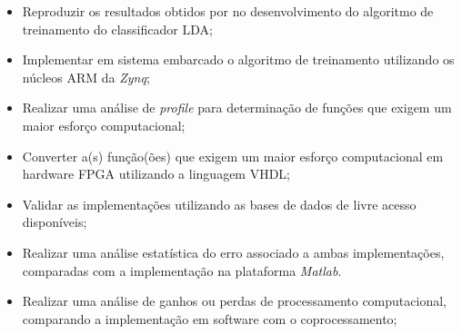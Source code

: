 \begin{itemize}
	\item Reproduzir os resultados obtidos por \cite{F.Lotte} no desenvolvimento do algoritmo de treinamento do classificador LDA;

	\item Implementar em sistema embarcado o algoritmo de treinamento utilizando os núcleos ARM da \textit{Zynq};
	
	\item Realizar uma análise de \textit{profile} para determinação de funções que exigem um maior esforço computacional;
	
	\item Converter a(s) função(ões) que exigem um maior esforço computacional em hardware FPGA utilizando a linguagem VHDL;
	

	\item Validar as implementações utilizando as bases de dados de livre acesso disponíveis;
	
	\item Realizar uma análise estatística do erro associado a ambas implementações, comparadas com a implementação na plataforma \textit{Matlab}.
	
	\item Realizar uma análise de ganhos ou perdas de processamento computacional, comparando a implementação em software com o coprocessamento;
\end{itemize}
